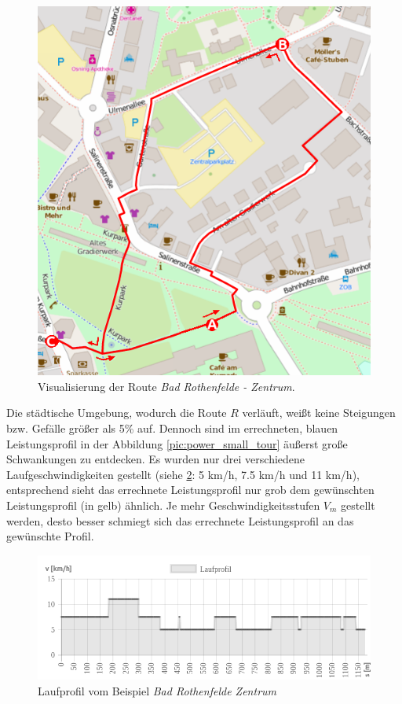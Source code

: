 \documentclass[12pt]{article}
\begin{document}
\begin{figure}[hp]
	\begin{center}
	\includegraphics[width=\textwidth]{pics/png/01_Ergebnis_Small_Tour.png}
	\caption{Visualisierung der Route \textit{Bad Rothenfelde - Zentrum}. }
	\label{pic:small_tour}
	\end{center}
\end{figure}

Die städtische Umgebung, wodurch die Route $R$ verläuft, weißt keine Steigungen bzw. Gefälle größer als 5\% auf. Dennoch sind im errechneten, blauen Leistungsprofil in der Abbildung \ref{pic:power_small_tour} äußerst große Schwankungen zu entdecken. Es wurden nur drei verschiedene Laufgeschwindigkeiten gestellt (siehe \ref{pic:run_small_tour}: 5 km/h, 7.5 km/h und 11 km/h), entsprechend sieht das errechnete Leistungsprofil nur grob dem gewünschten Leistungsprofil (in gelb) ähnlich. Je mehr Geschwindigkeitsstufen $V_m$ gestellt werden, desto besser schmiegt sich das errechnete Leistungsprofil an das gewünschte Profil. 

\begin{figure}[ht]
	\begin{center}
	\includegraphics[width=\textwidth]{pics/png/03_Laufprofil_Small_Tour.png}
	\caption{Laufprofil vom Beispiel \textit{Bad Rothenfelde Zentrum}}
	\label{pic:run_small_tour}
	\end{center}
\end{figure}
\end{document}
